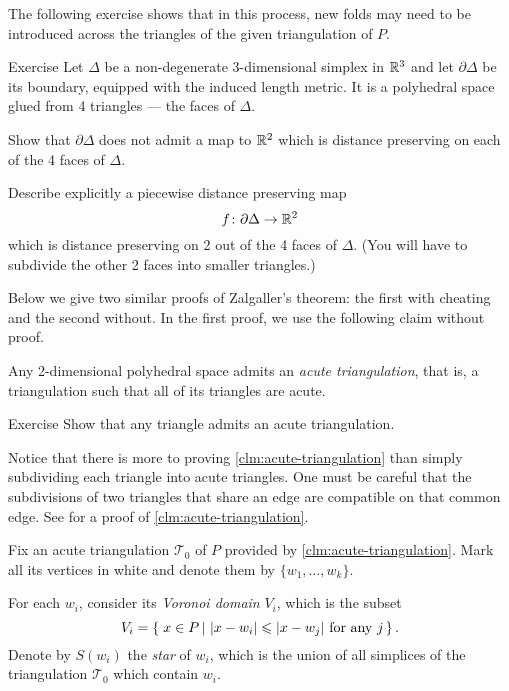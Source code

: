 The following exercise shows that in this process, new folds may need to be introduced across the triangles of the given triangulation of $P$.

\begin{thm}{Exercise}\label{pdp-for-tetrahedron}
Let $\Delta$ be a non-degenerate 3-dimensional simplex in $\mathbb{R}^3$
and let $\partial\Delta$ be its boundary, equipped with the induced length metric. It is a polyhedral space glued from 4 triangles --- the faces of $\Delta$.

Show that $\partial\Delta$ does not admit a map to $\mathbb{R}^2$ which is distance preserving on each of the 4 faces of $\Delta$.

Describe explicitly a piecewise distance preserving map 
$$f\:\partial\Delta\z\to\RR^2$$
which is distance preserving 
on 2 out of the 4 faces of $\Delta$.  (You will have to subdivide the other 2 faces into smaller triangles.)
\end{thm}




Below we give two similar proofs of Zalgaller's theorem: 
the first with cheating and the second without.
In the first proof, we use the following claim without proof.

\begin{clm}{}\label{clm:acute-triangulation}
Any 2-dimensional polyhedral space admits an 
\emph{acute triangulation},
that is, a triangulation such that all of its triangles are acute.
\end{clm}

\begin{thm}{Exercise}\label{ex:acute-triangulation}
Show that any triangle admits an acute triangulation.
\end{thm}

Notice that there is more to proving \ref{clm:acute-triangulation} than simply subdividing each triangle into acute triangles.  One must be careful that the subdivisions of two triangles that share an edge are compatible on that common edge.  See \cite{saraf} for a proof of \ref{clm:acute-triangulation}.

Fix an acute triangulation $\mathcal{T}_0$ of $P$ provided by \ref{clm:acute-triangulation}.
Mark all its vertices in white
and denote them by $\{w_1,\dots,w_k\}$.

For each $w_i$, consider its \emph{Voronoi domain} $V_i$,
which is the subset
$$V_i=\set{x\in P}{|x-w_i|\le|x-w_j|\ \text{for any}\ j}.$$
Denote by $S(w_i)$ the \emph{star} of $w_i$,
which is the union of all simplices of the triangulation $\mathcal{T}_0$ which contain $w_i$.

